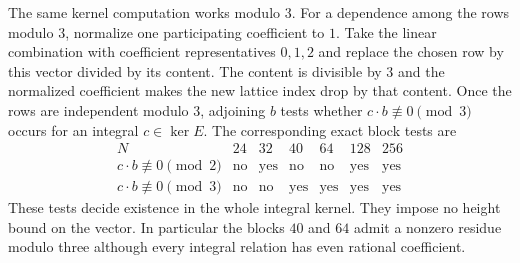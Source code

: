 \documentclass[11pt,a4paper]{article}
\theoremstyle{definition}\newtheorem{definition}[theorem]{Definition}\newtheorem{example}[theorem]{Example}
\theoremstyle{remark}\newtheorem{remark}[theorem]{Remark}
\begin{document}
The same kernel computation works modulo $3$. For a dependence among
the rows modulo $3$, normalize one participating coefficient to $1$.
Take the linear combination with coefficient representatives $0,1,2$
and replace the chosen row by this vector divided by its content.
The content is divisible by $3$ and the normalized coefficient makes
the new lattice index drop by that content. Once the rows are
independent modulo $3$, adjoining $b$ tests whether
$c\cdot b\not\equiv0\pmod3$ occurs for an integral $c\in\ker E$.
The corresponding exact block tests are
\[
\begin{array}{r|rrrrrr}
 N&24&32&40&64&128&256\\ \hline
 c\cdot b\not\equiv0\pmod2&\mathrm{no}&\mathrm{yes}&\mathrm{no}&\mathrm{no}&\mathrm{yes}&\mathrm{yes}\\
 c\cdot b\not\equiv0\pmod3&\mathrm{no}&\mathrm{no}&\mathrm{yes}&\mathrm{yes}&\mathrm{yes}&\mathrm{yes}
\end{array}
\]
These tests decide existence in the whole integral kernel. They impose
no height bound on the vector. In particular the blocks $40$ and $64$
admit a nonzero residue modulo three although every integral relation
has even rational coefficient.
\end{document}
